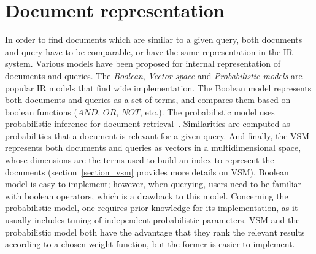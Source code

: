 \section{Document representation}
\label{sec:lsa:doc_repres}
In order to find documents which are similar to a given query, both documents and query have to be comparable, or have the same representation in the \gls{IR} system. Various models have been proposed for internal representation of documents and queries. The \textit{Boolean}, \textit{Vector space} and \textit{Probabilistic models} are popular \gls{IR} models that find wide implementation. The Boolean model represents both documents and queries as a set of terms, and compares them based on boolean functions ($AND$, $OR$, $NOT$, etc.). The probabilistic model uses probabilistic inference for document retrieval~\cite{probabilistic77}. Similarities are computed as probabilities that a document is relevant for a given query. And finally, the \gls{VSM} represents both documents and queries as vectors in a multidimensional space, whose dimensions are the terms used to build an index to represent the documents (section~\ref{section_vsm} provides more details on \gls{VSM}). Boolean model is easy to implement; however, when querying, users need to be familiar with boolean operators, which is a drawback to this model. Concerning the probabilistic model, one requires prior knowledge for its implementation, as it usually includes tuning of independent probabilistic parameters. \gls{VSM} and the probabilistic model both have the advantage that they rank the relevant results according to a chosen weight function, but the former is easier to implement. \\

